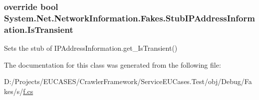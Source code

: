 \hypertarget{class_system_1_1_net_1_1_network_information_1_1_fakes_1_1_stub_i_p_address_information_a36c20f7c5c90f09b7b2cd7ce8b7b6a46}{
\subsubsection[{Is\-Transient}]{\setlength{\rightskip}{0pt plus 5cm}override bool System.\-Net.\-Network\-Information.\-Fakes.\-Stub\-I\-P\-Address\-Information.\-Is\-Transient\hspace{0.3cm}{\ttfamily [get]}}}\label{class_system_1_1_net_1_1_network_information_1_1_fakes_1_1_stub_i_p_address_information_a36c20f7c5c90f09b7b2cd7ce8b7b6a46}


Sets the stub of I\-P\-Address\-Information.\-get\-\_\-\-Is\-Transient()



The documentation for this class was generated from the following file\-:\begin{DoxyCompactItemize}
\item 
D\-:/\-Projects/\-E\-U\-C\-A\-S\-E\-S/\-Crawler\-Framework/\-Service\-E\-U\-Cases.\-Test/obj/\-Debug/\-Fakes/s/\hyperlink{s_2f_8cs}{f.\-cs}\end{DoxyCompactItemize}

